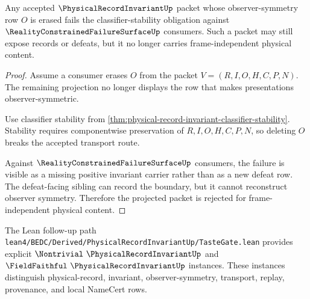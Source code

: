 \begin{theorem}
\label{thm:physical-record-invariant-falsifiable-prediction}
Any accepted $\PhysicalRecordInvariantUp$ packet whose observer-symmetry row $O$ is erased fails the classifier-stability obligation against $\RealityConstrainedFailureSurfaceUp$ consumers. Such a packet may still expose records or defeats, but it no longer carries frame-independent physical content.
\end{theorem}
\begin{proof}
Assume a consumer erases $O$ from the packet $V=(R,I,O,H,C,P,N)$. The remaining projection no longer displays the row that makes presentations observer-symmetric.

Use classifier stability from \autoref{thm:physical-record-invariant-classifier-stability}. Stability requires componentwise preservation of $R,I,O,H,C,P,N$, so deleting $O$ breaks the accepted transport route.

Against $\RealityConstrainedFailureSurfaceUp$ consumers, the failure is visible as a missing positive invariant carrier rather than as a new defeat row. The defeat-facing sibling can record the boundary, but it cannot reconstruct observer symmetry. Therefore the projected packet is rejected for frame-independent physical content.
\end{proof}



The Lean follow-up path \texttt{lean4/BEDC/Derived/PhysicalRecordInvariantUp/TasteGate.lean} provides explicit $\Nontrivial\ \PhysicalRecordInvariantUp$ and $\FieldFaithful\ \PhysicalRecordInvariantUp$ instances. These instances distinguish physical-record, invariant, observer-symmetry, transport, replay, provenance, and local NameCert rows.

